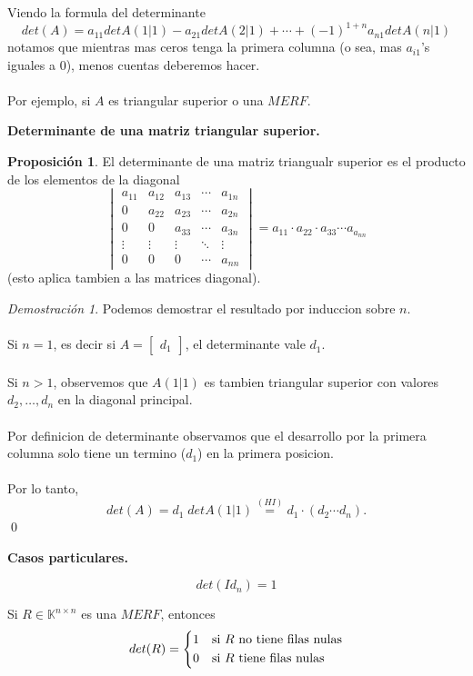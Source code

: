 \documentclass{article}
\theoremstyle{definition}
\theoremstyle{definition}
\newtheorem{prop}[teo]{Proposición}
\theoremstyle{remark}
\newtheorem*{demo}{Demostración}
\begin{document}
Viendo la formula del determinante \[
  det(A)=a_{11}detA(1|1)-a_{21}detA(2|1)+\cdots+(-1)^{1+n}a_{n1}detA(n|1)
\]
notamos que mientras mas ceros tenga la primera columna (o sea, mas $a_{i1}$'s iguales a $0$), menos cuentas deberemos hacer.\\\\
Por ejemplo, si $A$ es triangular superior o una $MERF$.
\pagebreak

\begin{center}
\textbf{Determinante de una matriz triangular superior.}
\end{center}
\begin{prop}
  El determinante de una matriz triangualr superior es el producto de los elementos de la diagonal \[
    \begin{vmatrix}
 a_{11} & a_{12} & a_{13} & \cdots & a_{1n} \\
  0 & a_{22} & a_{23} & \cdots & a_{2n} \\
  0 & 0 & a_{33} & \cdots & a_{3n} \\
    \vdots & \vdots & \vdots & \ddots & \vdots \\
    0 & 0 & 0 & \cdots & a_{nn}
  \end{vmatrix}=a_{11}\cdot a_{22} \cdot a_{33} \cdots a_{a_{nn}}
  \]
  (esto aplica tambien a las matrices diagonal).
\end{prop}
\begin{demo}
  Podemos demostrar el resultado por induccion sobre $n$. \\\\
  Si $n=1$, es decir si $A=\begin{bmatrix}d_{1}\end{bmatrix}$, el determinante vale $d_1$.\\\\
  Si $n>1$, observemos que $A(1|1)$ es tambien triangular superior con valores $d_2,\dots,d_n$ en la diagonal principal.\\\\
  Por definicion de determinante observamos que el desarrollo por la primera columna solo tiene un termino ($d_1$) en la primera posicion. \\\\
  Por lo tanto, \[
    det(A)=d_1 \; detA(1|1)\overset{(HI)}{=}d_1 \cdot (d_2 \cdots d_n). 
  \]
  \qed
\end{demo}
\begin{center}
\textbf{Casos particulares.}
\end{center}
\begin{corol2}
  \[
det(Id_n)=1
  \]
\end{corol2}
\begin{corol2}
  Si $R \in \mathbb{K}^{n \times n}$ es una $MERF$, entonces \[det(R)=\begin{dcases} 1 & \text{si } R \text{ no tiene filas nulas} \\
  0 & \text{si } R \text{ tiene filas nulas}
\end{dcases}\]
\end{corol2}\pagebreak
\end{document}
